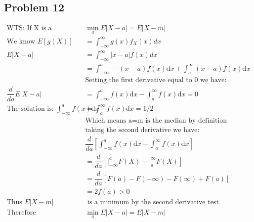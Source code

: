 \documentclass{article}
\newcommand{\dx}{\mathrm{d}x}
\begin{document}
\begin{flushleft}
\section*{Problem 12}
\begin{align*}
\text{WTS: If X is a continuous random variable: }&  \min_{a}E|X-a|=E|X-m|\\
\text{We know } E[g(X)]&=\int_{-\infty}^{\infty}g(x)f_X(x)dx\\
E|X-a|&=\int_{-\infty}^{\infty}|x-a|f(x)dx\\
&=\int_{-\infty}^{a}-(x-a)f(x)\dx +\int_{a}^{\infty}(x-a)f(x)\dx\\
&\text{Setting the first derivative equal to 0 we have:}\\
\dfrac{d}{da}E|X-a|&=\int_{-\infty}^{a}f(x)\dx-\int_{a}^{\infty}f(x)\dx=0\\
\text{The solution is: } \int_{-\infty}^{a}f(x)\dx&=\int_{a}^{\infty}f(x)\dx=1/2\\
&\text{Which means a=m is the median by definition}\\
&\text{taking the second derivative we have: }\\
&\dfrac{d}{da}\left[\int_{-\infty}^{a}f(x)\dx-\int_{a}^{\infty}f(x)\dx\right]\\
&=\dfrac{d}{da}\left[\bigg|_{-\infty}^{a}F(X)-\bigg|_{a}^{\infty}F(X)\right]\\
&=\dfrac{d}{da}\left[F(a)-F(-\infty)-F(\infty)+F(a)\right]\\
&=2f(a)>0\\
\text{Thus } E|X-m|& \text{ is a minimum by the second derivative test}\\
\text{Therefore } &\min_{a}E|X-a|=E|X-m|
\end{align*}

\end{flushleft}
\end{document}
